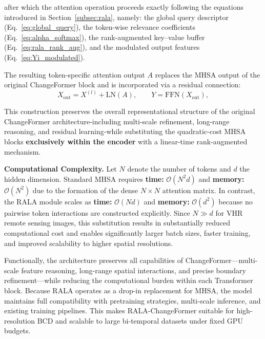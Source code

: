 \documentclass[runningheads]{llncs}
\newcommand{\journal}[1]{{\color{orange}#1}}
\begin{document}
after which the attention operation proceeds exactly following the equations
introduced in Section~\ref{subsec:rala}, namely: the global query descriptor
(Eq.~\ref{eq:global_query}), the token-wise relevance coefficients
(Eq.~\ref{eq:alpha_softmax}), the rank-augmented key–value buffer
(Eq.~\ref{eq:rala_rank_aug}), and the modulated output features
(Eq.~\ref{eq:Yi_modulated}).

The resulting token-specific attention output $A$ replaces the MHSA output of
the original ChangeFormer block and is incorporated via a residual connection:
\begin{equation}
X_{\text{out}}
    = X^{(l)} + \mathrm{LN}(A),
\qquad
Y = \mathrm{FFN}(X_{\text{out}}),
\label{eq:residual_ffn}
\end{equation}

This construction preserves the overall representational structure of the
original ChangeFormer architecture-including multi-scale refinement, long-range
reasoning, and residual learning-while substituting the quadratic-cost MHSA
blocks \textbf{exclusively within the encoder} with a linear-time
rank-augmented mechanism.

\noindent\textbf{Computational Complexity.}
Let $N$ denote the number of tokens and $d$ the hidden dimension.
Standard MHSA requires \textbf{time: }$\mathcal{O}(N^{2}d)$ and
\textbf{memory: }$\mathcal{O}(N^{2})$ due to the formation of the dense
$N\times N$ attention matrix.
In contrast, the RALA module scales as \textbf{time: }$\mathcal{O}(Nd)$ and
\textbf{memory: }$\mathcal{O}(d^{2})$ because no pairwise token interactions
are constructed explicitly.
Since $N \gg d$ for VHR remote sensing images, this substitution results in
substantially reduced computational cost and enables significantly larger batch
sizes, faster training, and improved scalability to higher spatial resolutions.

Functionally, the architecture preserves all capabilities of
ChangeFormer—multi-scale feature reasoning, long-range spatial interactions,
and precise boundary refinement—while reducing the computational burden within
each Transformer block. Because RALA operates as a drop-in replacement for
MHSA, the model maintains full compatibility with pretraining strategies,
multi-scale inference, and existing training pipelines. This makes
RALA-ChangeFormer suitable for high-resolution BCD and scalable to large
bi-temporal datasets under fixed GPU budgets.

\end{document}
